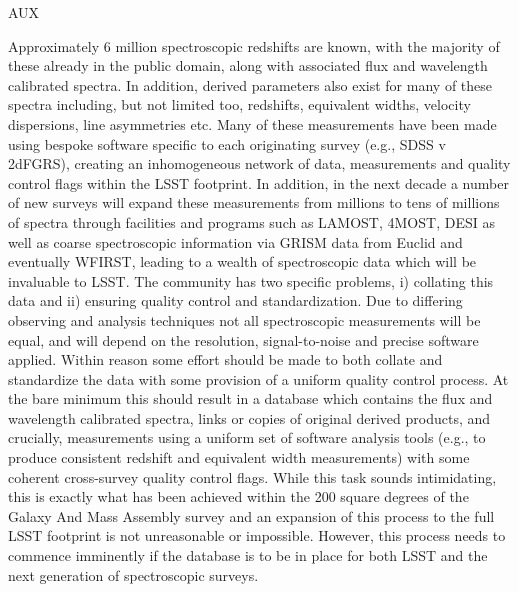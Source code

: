 {\begin{tasklist}{AUX}
\begin{task}
{Approximately 6 million spectroscopic redshifts are known, with the majority of these already in the public domain, along with associated flux and wavelength calibrated spectra. In addition, derived parameters also exist for many of these spectra including, but not limited too, redshifts, equivalent widths, velocity dispersions, line asymmetries etc. Many of these measurements have been made using bespoke software specific to each originating survey (e.g., SDSS v 2dFGRS), creating an inhomogeneous network of data, measurements and quality control flags within the LSST footprint.
In addition, in the next decade a number of new surveys will expand these measurements from millions to tens of millions of spectra through facilities and programs such as LAMOST, 4MOST, DESI as well as coarse spectroscopic information via GRISM data from Euclid and eventually WFIRST, leading to a wealth of spectroscopic data which will be invaluable to LSST.
The community has two specific problems, i) collating this data and ii) ensuring quality control and standardization. Due to differing observing and analysis techniques not all spectroscopic measurements will be equal, and will depend on the resolution, signal-to-noise and precise software applied.
Within reason some effort should be made to both collate and standardize the data with some provision of a uniform quality control process. At the bare minimum this should result in a database which contains the flux and wavelength calibrated spectra, links or copies of original derived products, and crucially, measurements using a uniform set of software analysis tools (e.g., to produce consistent redshift and equivalent width measurements) with some coherent cross-survey quality control flags.
While this task sounds intimidating, this is exactly what has been achieved within the 200 square degrees of the Galaxy And Mass Assembly survey \citep{driver2011a,driver2016a,liske2015a} and an expansion of this process to the full LSST footprint is not unreasonable or impossible. However, this process needs to commence imminently if the database is to be in place for both LSST and the next generation of spectroscopic surveys.
}
~\\
\end{task}




\end{tasklist}}
